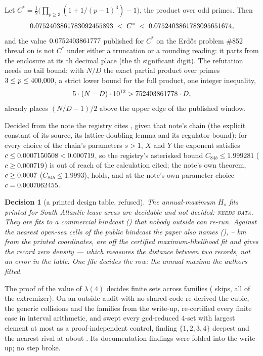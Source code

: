 \documentclass[11pt]{article}
\theoremstyle{plain}
\newtheorem{decision}{Decision}
\theoremstyle{definition}
\begin{document}
\begin{theorem}\label{thm:cstar}
Let $C^*=\tfrac12\bigl(\prod_{p\ge3}(1+1/(p-1)^3)-1\bigr)$, the product over odd primes. Then
\[
0.0752403861783092455893{} \;<\; C^* \;<\; 0.0752403861783095651674{},
\]
and the value $0.0752403861777$ published for $C^*$ on the Erd\H{o}s problem \#852 thread on \CstarThreadDate{} is not $C^*$ under either a truncation or a rounding reading: it parts from the enclosure at its \CstarPlace{}th decimal place (the \CstarSig{}th significant digit). The refutation needs no tail bound: with $N/D$ the exact partial product over primes $3\le p\le400{,}000$, a strict lower bound for the full product, one integer inequality,
\[
5\cdot (N-D)\cdot 10^{12} > 752403861778\cdot D ,
\]
already places $(N/D-1)/2$ above the upper edge of the published window.
\end{theorem}

\begin{proposition}\label{prop:repair}
Decided from the note the registry cites \cite{Althoefer26}, given that note's chain (the explicit constant of its source, its lattice-doubling lemma and its regulator bound): for every choice of the chain's parameters $s>1$, $X$ and $Y$ the exponent satisfies $c\le0.0007150508<0.000719$, so the registry's asterisked bound $C_{84b}\le1.999281$ ($c\ge0.000719$) is out of reach of the calculation cited; the note's own theorem, $c\ge0.0007$ ($C_{84b}\le1.9993$), holds, and at the note's own parameter choice $c=0.0007062455$.
\end{proposition}

\begin{decision}[a printed design table, refused]\label{dec:table}
The \DtDecided{} annual-maximum $H_s$ fits printed for \DtAreas{} South Atlantic lease areas \cite{Bhaskaran23} are decidable and not decided: \textsc{needs data}. They are fits to a commercial hindcast (\DtPrivate) that nobody outside can re-run. Against the nearest open-sea cells of the public hindcast the paper also names (\DtPublic), \DtKmMin{}--\DtKmMax{} km from the printed coordinates, \DtOff{} are off the certified maximum-likelihood fit and \DtOutside{} gives the record zero density --- which measures the distance between two records, not an error in the table. One file decides the row: the annual maxima the authors fitted.
\end{decision}

\begin{proposition}\label{prop:recert}
The proof of the value of $\lambda(4)$ \cite{Lambda4} decides \LfClosed{} finite sets across \LfFamilies{} families (\LfSkips{} skips, all of the extremizer). On \LfOutsideDate{} an outside audit with no shared code \cite{Lambda4Audit} re-derived the cubic, the \LfGeneric{} generic collisions and the \LfFamilies{} families from the write-up, re-certified every finite case in interval arithmetic, and swept every gcd-reduced $4$-set with largest element at most \LfOutsideMax{} as a proof-independent control, finding $\{1,2,3,4\}$ deepest and the nearest rival \LfRival{} at about \LfRivalValue{}. Its \LfFindings{} documentation findings were folded into the write-up; no step broke.
\end{proposition}
\end{document}
